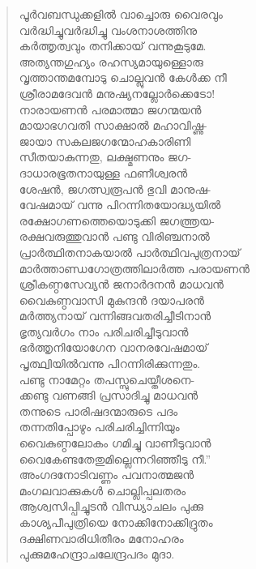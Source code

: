 \begin{verse}
പൂര്‍വബന്ധുക്കളില്‍ വാച്ചൊരു വൈരവും\\
വര്‍ദ്ധിച്ചുവര്‍ദ്ധിച്ചു വംശനാശത്തിനു\\
കര്‍ത്തൃത്വവും തനിക്കായ് വന്നുകൂടുമേ.\\
അത്യന്തഗുഹ്യം രഹസ്യമായുള്ളൊരു\\
വൃത്താന്തമമ്പോടു ചൊല്ലുവന്‍ കേള്‍ക്ക നീ\\
ശ്രീരാമദേവന്‍ മനുഷ്യനല്ലോര്‍ക്കെടോ!\\
നാരായണന്‍ പരമാത്മാ ജഗന്മയന്‍\\
മായാഭഗവതി സാക്ഷാല്‍ മഹാവിഷ്ണു-\\
ജായാ സകലജഗന്മോഹകാരിണി\\
സീതയാകുന്നതു, ലക്ഷ്മണനും ജഗ-\\
ദാധാരഭൂതനായുള്ള ഫണീശ്വരന്‍\\
ശേഷന്‍, ജഗത്സ്വരൂപന്‍ ഭുവി മാനുഷ-\\
വേഷമായ് വന്നു പിറന്നിതയോദ്ധ്യയില്‍\\
രക്ഷോഗണത്തെയൊടുക്കി ജഗത്ത്രയ-\\
രക്ഷവരുത്തുവാന്‍ പണ്ടു വിരിഞ്ചനാല്‍\\
പ്രാര്‍ത്ഥിതനാകയാല്‍ പാര്‍ത്ഥിവപുത്രനായ്\\
മാര്‍ത്താണ്ഡഗോത്രത്തിലാര്‍ത്ത പരായണന്‍\\
ശ്രീകണ്ഠസേവ്യന്‍ ജനാര്‍ദനന്‍ മാധവന്‍\\
വൈകുണ്ഠവാസി മുകുന്ദന്‍ ദയാപരന്‍\\
മര്‍ത്ത്യനായ് വന്നിങ്ങവതരിച്ചീടിനാന്‍\\
ഭൃത്യവര്‍ഗം നാം പരിചരിച്ചീടുവാന്‍\\
ഭര്‍ത്തൃനിയോഗേന വാനരവേഷമായ്\\
പൃത്ഥ്വിയില്‍വന്നു പിറന്നിരിക്കുന്നതും.\\
പണ്ടു നാമേറ്റം തപസ്സുചെയ്തീശനെ-\\
ക്കണ്ടു വണങ്ങി പ്രസാദിച്ചു മാധവന്‍\\
തന്നുടെ പാരിഷദന്മാരുടെ പദം\\
തന്നതിപ്പോഴും പരിചരിച്ചിന്നിയും\\
വൈകുണ്ഠലോകം ഗമിച്ചു വാണീടുവാന്‍\\
വൈകേണ്ടതേതുമില്ലെന്നറിഞ്ഞീടു നീ.”\\
അംഗദനോടിവണ്ണം പവനാത്മജന്‍\\
മംഗലവാക്കുകള്‍ ചൊല്ലിപ്പലതരം\\
ആശ്വസിപ്പിച്ചുടന്‍ വിന്ധ്യാചലം പുക്കു\\
കാശ്യപീപുത്രിയെ നോക്കിനോക്കിദ്രുതം\\
ദക്ഷിണവാരിധിതീരം മനോഹരം\\
പുക്കുമഹേന്ദ്രാചലേന്ദ്രപദം മുദാ.\\

\end{verse}

